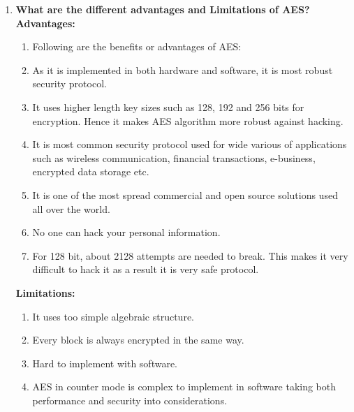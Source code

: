 \documentclass[11pt]{article}
\begin{document}
\begin{enumerate}
	\item \textbf{What are the different advantages and Limitations of AES?}\\
	      \textbf{Advantages: }\\
	      \begin{enumerate}
		      \item Following are the benefits or advantages of AES:
		      \item As it is implemented in both hardware and software, it is most robust security protocol.
		      \item It uses higher length key sizes such as 128, 192 and 256 bits for encryption. Hence it makes AES algorithm more robust against hacking.
		      \item It is most common security protocol used for wide various of applications such as wireless communication, financial transactions, e-business, encrypted data storage etc.
		      \item It is one of the most spread commercial and open source solutions used all over the world.
		      \item No one can hack your personal information.
		      \item For 128 bit, about 2128 attempts are needed to break. This makes it very difficult to hack it as a result it is very safe protocol.
	      \end{enumerate}


	      \textbf{Limitations: }\\
	      \begin{enumerate}
		      \item It uses too simple algebraic structure.
		      \item Every block is always encrypted in the same way.
		      \item Hard to implement with software.
		      \item AES in counter mode is complex to implement in software taking both performance and security into considerations.
	      \end{enumerate}

\end{enumerate}
\end{document}
